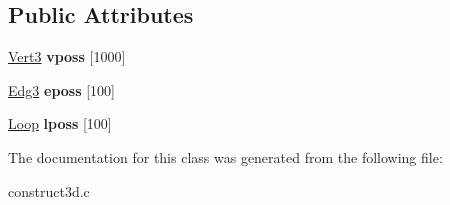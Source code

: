 \subsection*{Public Attributes}
\begin{DoxyCompactItemize}
\item 
\mbox{\label{classconstruct3d_a3c4090f4604cd2d67b094c6e9922bca4}} 
\mbox{\hyperlink{class_vert3}{Vert3}} {\bfseries vposs} \mbox{[}1000\mbox{]}
\item 
\mbox{\label{classconstruct3d_a88a90730d72fe7044d7fdbfc209a2b7d}} 
\mbox{\hyperlink{class_edg3}{Edg3}} {\bfseries eposs} \mbox{[}100\mbox{]}
\item 
\mbox{\label{classconstruct3d_a232d2b6cdfa8a8a3f7fb8e318dbc2034}} 
\mbox{\hyperlink{class_loop}{Loop}} {\bfseries lposs} \mbox{[}100\mbox{]}
\end{DoxyCompactItemize}


The documentation for this class was generated from the following file\+:\begin{DoxyCompactItemize}
\item 
construct3d.\+c\end{DoxyCompactItemize}
